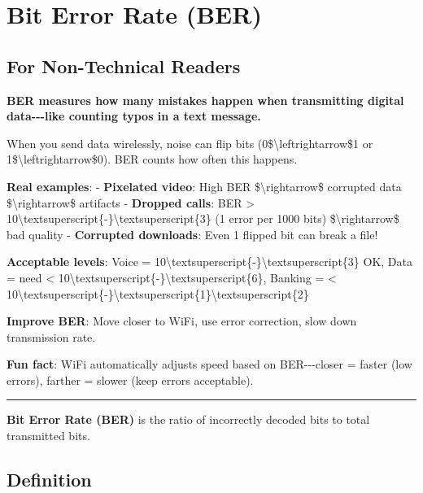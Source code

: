\section{Bit Error Rate (BER)}\label{bit-error-rate-ber}

\subsection{\texorpdfstring{ For Non-Technical
Readers}{ For Non-Technical Readers}}\label{for-non-technical-readers}

\textbf{BER measures how many mistakes happen when transmitting digital
data-\/-\/-like counting typos in a text message.}

When you send data wirelessly, noise can flip bits
(0\$\textbackslash leftrightarrow\$1 or
1\$\textbackslash leftrightarrow\$0). BER counts how often this happens.

\textbf{Real examples}: - \textbf{Pixelated video}: High BER
\$\textbackslash rightarrow\$ corrupted data
\$\textbackslash rightarrow\$ artifacts - \textbf{Dropped calls}: BER
\textgreater{}
10\textbackslash textsuperscript\{-\}\textbackslash textsuperscript\{3\}
(1 error per 1000 bits) \$\textbackslash rightarrow\$ bad quality -
\textbf{Corrupted downloads}: Even 1 flipped bit can break a file!

\textbf{Acceptable levels}: Voice =
10\textbackslash textsuperscript\{-\}\textbackslash textsuperscript\{3\}
OK, Data = need \textless{}
10\textbackslash textsuperscript\{-\}\textbackslash textsuperscript\{6\},
Banking = \textless{}
10\textbackslash textsuperscript\{-\}\textbackslash textsuperscript\{1\}\textbackslash textsuperscript\{2\}

\textbf{Improve BER}: Move closer to WiFi, use error correction, slow
down transmission rate.

\textbf{Fun fact}: WiFi automatically adjusts speed based on
BER-\/-\/-closer = faster (low errors), farther = slower (keep errors
acceptable).

\begin{center}\rule{0.5\linewidth}{0.5pt}\end{center}

\textbf{Bit Error Rate (BER)} is the ratio of incorrectly decoded bits
to total transmitted bits.

\subsection{Definition}\label{definition}

